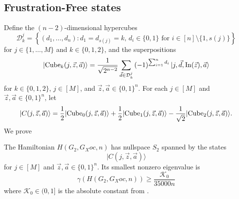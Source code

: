 \documentclass[../thesis-main/thesis-main]{subfiles}
\begin{document}
\subsection{Frustration-Free states}

Define the $(n-2)$-dimensional hypercubes
\begin{equation}
\mathcal{D}_{k}^{j}=\left\{ (d_{1},\ldots,d_{n})\colon d_{1}=d_{s(j)}=k,\, d_{i}\in\{0,1\}\text{ for }i\in[n]\setminus\{1,s(j)\}\right\} 
\end{equation}
for $j\in\{1,\ldots,M\}$ and $k\in\{0,1,2\}$, and the superpositions
\begin{equation}
|{\operatorname{Cube}_{k}(j,\vec{z},\vec{a})}\rangle=\frac{1}{\sqrt{2^{n-2}}}\sum_{\vec{d}\in\mathcal{D}_{k}^{j}}\left(-1\right)^{\sum_{i=1}^{n}d_{i}}|j,\vec{d},\operatorname{In}(\vec{z}),\vec{a}\rangle
\end{equation}
for $k\in\{0,1,2\}$, $j\in[M]$, and $\vec{z},\vec{a}\in\{0,1\}^{n}.$
For each $j\in[M]$ and $\vec{z},\vec{a}\in\{0,1\}^{n}$, let
\begin{equation}
|C(j,\vec{z},\vec{a})\rangle=\frac{1}{2}|{\operatorname{Cube}_{0}(j,\vec{z},\vec{a})}\rangle+\frac{1}{2}|{\operatorname{Cube}_{1}(j,\vec{z},\vec{a})}\rangle-\frac{1}{\sqrt{2}}|{\operatorname{Cube}_{2}(j,\vec{z},\vec{a})}\rangle.\label{eq:cubestates-1}
\end{equation}
We prove

\begin{lemma}
\label{lem:beta_bound}The Hamiltonian $H(G_{2},G_Xoc,n)$ has nullspace $S_2$ spanned by the states
\begin{equation}
|C(j,\vec{z},\vec{a})\rangle
\end{equation}
for $j\in[M]$ and $\vec{z},\vec{a}\in\{0,1\}^{n}$. Its smallest nonzero eigenvalue is 
\begin{equation}
  \gamma(H(G_{2},G_Xoc,n)) \geq \frac{\mathcal{K}_0}{35000n}
\end{equation}
where $\mathcal{K}_0\in (0,1]$ is the absolute constant from .
\end{lemma}
\end{document}

